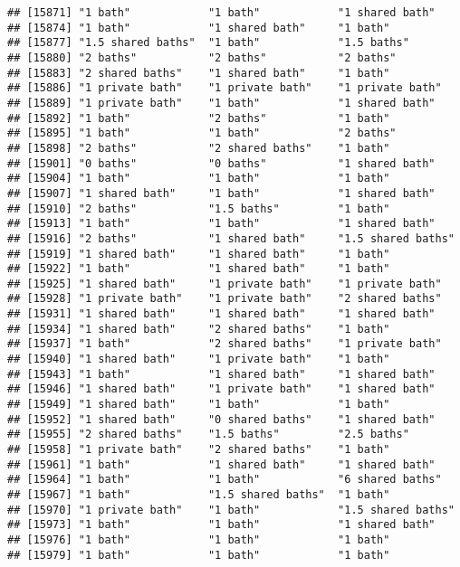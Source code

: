 \documentclass[
]{article}
\begin{document}
\begin{verbatim}
## [15871] "1 bath"            "1 bath"            "1 shared bath"    
## [15874] "1 bath"            "1 shared bath"     "1 bath"           
## [15877] "1.5 shared baths"  "1 bath"            "1.5 baths"        
## [15880] "2 baths"           "2 baths"           "2 baths"          
## [15883] "2 shared baths"    "1 shared bath"     "1 bath"           
## [15886] "1 private bath"    "1 private bath"    "1 private bath"   
## [15889] "1 private bath"    "1 bath"            "1 shared bath"    
## [15892] "1 bath"            "2 baths"           "1 bath"           
## [15895] "1 bath"            "1 bath"            "2 baths"          
## [15898] "2 baths"           "2 shared baths"    "1 bath"           
## [15901] "0 baths"           "0 baths"           "1 shared bath"    
## [15904] "1 bath"            "1 bath"            "1 bath"           
## [15907] "1 shared bath"     "1 bath"            "1 shared bath"    
## [15910] "2 baths"           "1.5 baths"         "1 bath"           
## [15913] "1 bath"            "1 bath"            "1 shared bath"    
## [15916] "2 baths"           "1 shared bath"     "1.5 shared baths" 
## [15919] "1 shared bath"     "1 shared bath"     "1 bath"           
## [15922] "1 bath"            "1 shared bath"     "1 bath"           
## [15925] "1 shared bath"     "1 private bath"    "1 private bath"   
## [15928] "1 private bath"    "1 private bath"    "2 shared baths"   
## [15931] "1 shared bath"     "1 shared bath"     "1 shared bath"    
## [15934] "1 shared bath"     "2 shared baths"    "1 bath"           
## [15937] "1 bath"            "2 shared baths"    "1 private bath"   
## [15940] "1 shared bath"     "1 private bath"    "1 bath"           
## [15943] "1 bath"            "1 shared bath"     "1 shared bath"    
## [15946] "1 shared bath"     "1 private bath"    "1 shared bath"    
## [15949] "1 shared bath"     "1 bath"            "1 bath"           
## [15952] "1 shared bath"     "0 shared baths"    "1 shared bath"    
## [15955] "2 shared baths"    "1.5 baths"         "2.5 baths"        
## [15958] "1 private bath"    "2 shared baths"    "1 bath"           
## [15961] "1 bath"            "1 shared bath"     "1 shared bath"    
## [15964] "1 bath"            "1 bath"            "6 shared baths"   
## [15967] "1 bath"            "1.5 shared baths"  "1 bath"           
## [15970] "1 private bath"    "1 bath"            "1.5 shared baths" 
## [15973] "1 bath"            "1 bath"            "1 shared bath"    
## [15976] "1 bath"            "1 bath"            "1 bath"           
## [15979] "1 bath"            "1 bath"            "1 bath"           

\end{verbatim}
\end{document}
